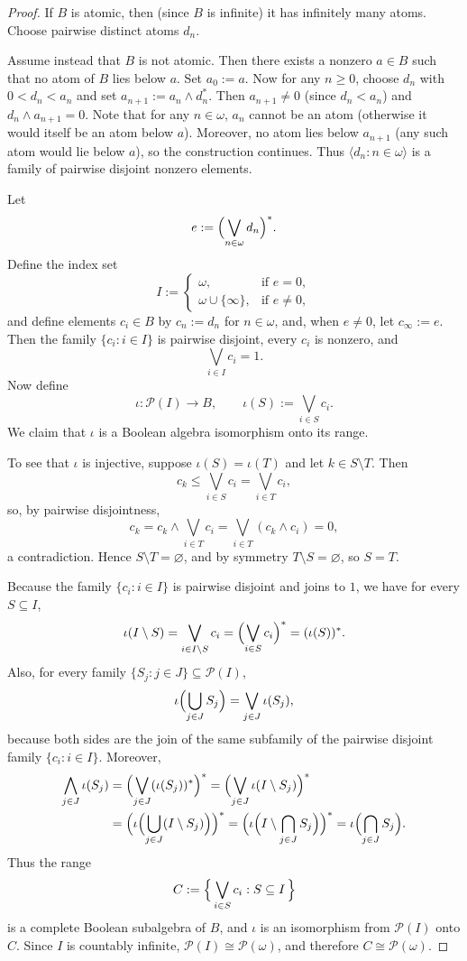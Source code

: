 \documentclass[11pt]{amsart}
\theoremstyle{definition}
\theoremstyle{plain}
\newcommand{\Pow}{\mathcal P}
\begin{document}
\begin{proof}
If $B$ is atomic, then (since $B$ is infinite) it has infinitely many atoms.
Choose pairwise distinct atoms $d_n$.

Assume instead that $B$ is not atomic. Then there exists a nonzero $a\in B$ such that no atom of $B$ lies below $a$.
Set $a_0:=a$. Now for any $n \geq 0$, choose $d_n$ with $0<d_n<a_n$ and set $a_{n+1}:=a_n\wedge d_n^{\ast}$.
Then $a_{n+1}\neq 0$ (since $d_n<a_n$) and $d_n\wedge a_{n+1}=0$.
Note that for any $n \in \omega$, $a_n$ cannot be an atom (otherwise it would itself be an atom below $a$).
Moreover, no atom lies below $a_{n+1}$ (any such atom would lie below $a$), so the construction continues.
Thus $\langle d_n:n\in\omega\rangle$ is a family of pairwise disjoint nonzero elements.

Let
\[
e:=\Bigl(\bigvee_{n\in\omega} d_n\Bigr)^{\ast}.
\]
Define the index set
\[
I:=\begin{cases}
\omega, & \text{if } e=0,\\
\omega\cup\{\infty\}, & \text{if } e\neq 0,
\end{cases}
\]
and define elements $c_i\in B$ by $c_n:=d_n$ for $n\in\omega$, and, when $e\neq 0$, let $c_{\infty}:=e$.
Then the family $\{c_i:i\in I\}$ is pairwise disjoint, every $c_i$ is nonzero, and
\[
\bigvee_{i\in I} c_i=1.
\]
Now define
\[
\iota:\Pow(I)\to B,
\qquad
\iota(S):=\bigvee_{i\in S} c_i.
\]
We claim that $\iota$ is a Boolean algebra isomorphism onto its range.

To see that $\iota$ is injective, suppose $\iota(S)=\iota(T)$ and let $k\in S\setminus T$.
Then
\[
c_k\leq \bigvee_{i\in S} c_i = \bigvee_{i\in T} c_i,
\]
so, by pairwise disjointness,
\[
c_k=c_k\wedge\bigvee_{i\in T} c_i=\bigvee_{i\in T}(c_k\wedge c_i)=0,
\]
a contradiction. Hence $S\setminus T=\varnothing$, and by symmetry $T\setminus S=\varnothing$, so $S=T$.

Because the family $\{c_i:i\in I\}$ is pairwise disjoint and joins to $1$, we have for every $S\subseteq I$,
\[
\iota(I\setminus S)=\bigvee_{i\in I\setminus S} c_i
=\Bigl(\bigvee_{i\in S} c_i\Bigr)^{\ast}
=(\iota(S))^{\ast}.
\]
Also, for every family $\{S_j:j\in J\}\subseteq \Pow(I)$,
\[
\iota\Bigl(\bigcup_{j\in J} S_j\Bigr)=\bigvee_{j\in J}\iota(S_j),
\]
because both sides are the join of the same subfamily of the pairwise disjoint family $\{c_i:i\in I\}$.
Moreover,
\begin{align*}
\bigwedge_{j\in J}\iota(S_j)
&=\Bigl(\bigvee_{j\in J}(\iota(S_j))^{\ast}\Bigr)^{\ast}
 =\Bigl(\bigvee_{j\in J}\iota(I\setminus S_j)\Bigr)^{\ast} \\
&=\Bigl(\iota\Bigl(\bigcup_{j\in J}(I\setminus S_j)\Bigr)\Bigr)^{\ast}
 =\Bigl(\iota\Bigl(I\setminus \bigcap_{j\in J}S_j\Bigr)\Bigr)^{\ast}
 =\iota\Bigl(\bigcap_{j\in J}S_j\Bigr).
\end{align*}
Thus the range
\[
C:=\Bigl\{\,\bigvee_{i\in S} c_i : S\subseteq I\,\Bigr\}
\]
is a complete Boolean subalgebra of $B$, and $\iota$ is an isomorphism from $\Pow(I)$ onto $C$.
Since $I$ is countably infinite, $\Pow(I)\cong \Pow(\omega)$, and therefore $C\cong \Pow(\omega)$.
\end{proof}
\end{document}
